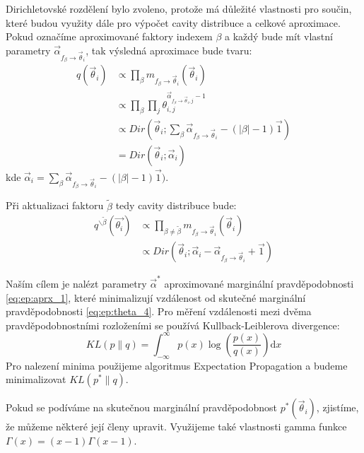 Dirichletovské rozdělení bylo zvoleno, protože má důležité vlastnosti pro
součin, které budou využity dále pro výpočet cavity distribuce a celkové
aproximace. Pokud označíme aproximované faktory indexem $\beta$ a každý bude
mít vlastní parametry $\vec\alpha_{f_\beta \rightarrow \vec\theta_i}$, tak výsledná aproximace bude
tvaru:
\begin{align}
q(\vec{\theta}_i) &\propto
    \prod_\beta
    m_{f_\beta \rightarrow \vec{\theta}_i}(\vec{\theta}_i)
\\
&\propto
    \prod_\beta
        \prod_j
            \theta_{i,j}^{\vec\alpha_{f_\beta \rightarrow \vec\theta_i, j} - 1}
\\
&\propto
    Dir(\vec{\theta}_i;
        \sum_\beta \vec\alpha_{f_\beta \rightarrow \vec\theta_i} - (|\beta| - 1) \vec{1})
\\
&=
    Dir(\vec{\theta}_i;
        \vec{\alpha}_i)
\label{eq:ep:aprx_1}
\end{align}
kde $\vec{\alpha}_i = \sum_\beta \vec\alpha_{f_\beta \rightarrow \vec\theta_i} - (|\beta| - 1)
\vec{1})$.

Při aktualizaci faktoru $\tilde\beta$ tedy cavity distribuce bude:
\begin{align}
q^{\backslash \tilde\beta} (\vec{\theta_i})
&\propto
    \prod_{\beta \ne \tilde\beta}
        m_{f_\beta \rightarrow \vec{\theta}_i}(\vec{\theta}_i)
\\
& \propto
Dir(\vec{\theta}_i;
    \vec{\alpha}_i - \vec\alpha_{f_\beta \rightarrow \vec\theta_i} + \vec{1})
\end{align}

Naším cílem je nalézt parametry $\vec{\alpha}^*$ aproximované marginální
pravděpodobnosti \eqref{eq:ep:aprx_1}, které minimalizují vzdálenost od
skutečné marginální pravděpodobnosti \eqref{eq:ep:theta_4}. Pro měření
vzdálenosti mezi dvěma pravděpodobnostními rozloženími se používá
Kullback-Leiblerova divergence:
\begin{equation}
KL(p \| q) =
\int_{-\infty}^{\infty}
    p(x) \log\left(\frac{p(x)}{q(x)}\right) \mathrm{d}x
\end{equation}
Pro nalezení minima použijeme algoritmus Expectation Propagation a budeme
minimalizovat $KL(p^*\| q)$.

Pokud se podíváme na skutečnou marginální pravděpodobnost
$p^*(\vec{\theta}_i)$, zjistíme, že můžeme některé její členy upravit.
Využijeme také vlastnosti gamma funkce $\Gamma(x) = (x-1) \Gamma(x-1)$.

